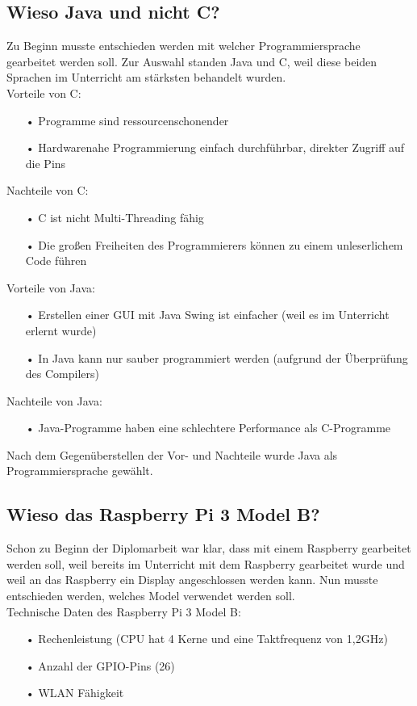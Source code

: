 \subsection{Wieso Java und nicht C?}
Zu Beginn musste entschieden werden mit welcher Programmiersprache gearbeitet werden soll. Zur Auswahl standen Java und C, weil diese beiden Sprachen im Unterricht am stärksten behandelt wurden.
\\Vorteile von C:
\begin{itemize}
\item[•] Programme sind ressourcenschonender
\item[•] Hardwarenahe Programmierung einfach durchführbar, direkter Zugriff auf die Pins
\end{itemize}

Nachteile von C:
\begin{itemize}
\item[•] C ist nicht Multi-Threading fähig
\item[•] Die großen Freiheiten des Programmierers können zu einem unleserlichem Code führen
\end{itemize}

Vorteile von Java:
\begin{itemize}
\item[•] Erstellen einer \ac{GUI} mit Java Swing ist einfacher (weil es im Unterricht erlernt wurde)
\item[•] In Java kann nur sauber programmiert werden (aufgrund der Überprüfung des Compilers)
\end{itemize}

Nachteile von Java:
\begin{itemize}
\item[•] Java-Programme haben eine schlechtere Performance als C-Programme 
\end{itemize}

Nach dem Gegenüberstellen der Vor- und Nachteile wurde Java als Programmiersprache gewählt.

\subsection{Wieso das Raspberry Pi 3 Model B?}
Schon zu Beginn der Diplomarbeit war klar, dass mit einem Raspberry gearbeitet werden soll, weil bereits im Unterricht mit dem Raspberry gearbeitet wurde und weil an das Raspberry ein Display angeschlossen werden kann. Nun musste entschieden werden, welches Model verwendet werden soll.
\\ Technische Daten des Raspberry Pi 3 Model B:
\begin{itemize}
\item[•] Rechenleistung (CPU hat 4 Kerne und eine Taktfrequenz von 1,2GHz)
\item[•] Anzahl der \ac{GPIO}-Pins (26)
\item[•] \ac{WLAN} Fähigkeit
\end{itemize}

